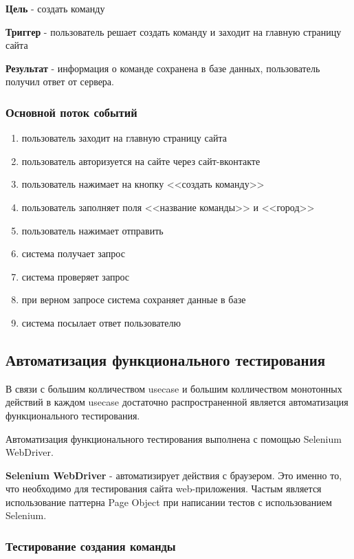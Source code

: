 \textbf{Цель} - создать команду

\textbf{Триггер} - пользователь решает создать команду и заходит на главную страницу сайта

\textbf{Результат} - информация о команде сохранена в базе данных, пользователь получил ответ от сервера.

\subsubsection{Основной поток событий}
\begin{enumerate}
	\item пользователь заходит на главную страницу сайта
	\item пользователь авторизуется на сайте через сайт-вконтакте
	\item пользователь нажимает на кнопку <<создать команду>>
	\item пользователь заполняет поля <<название команды>> и <<город>>
	\item пользователь нажимает отправить
	\item система получает запрос
	\item система проверяет запрос
	\item при верном запросе система сохраняет данные в базе
	\item система посылает ответ пользователю
\end{enumerate}

\subsection{Автоматизация функционального тестирования}

В связи с большим колличеством usecase и большим колличеством монотонных действий в каждом usecase достаточно распространенной является автоматизация функционального тестирования.

Автоматизация функционального тестирования выполнена с помощью Selenium WebDriver.  

\textbf{Selenium WebDriver} - автоматизирует действия с браузером. Это именно то, что необходимо для тестирования сайта web-приложения. Частым является использование паттерна Page Object при написании тестов с использованием Selenium.

\subsubsection{Тестирование создания команды}

